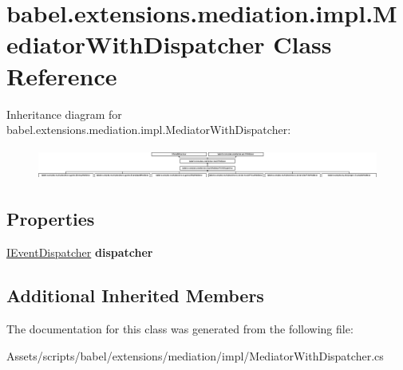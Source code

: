 \hypertarget{classbabel_1_1extensions_1_1mediation_1_1impl_1_1_mediator_with_dispatcher}{\section{babel.\-extensions.\-mediation.\-impl.\-Mediator\-With\-Dispatcher Class Reference}
\label{classbabel_1_1extensions_1_1mediation_1_1impl_1_1_mediator_with_dispatcher}
}
Inheritance diagram for babel.\-extensions.\-mediation.\-impl.\-Mediator\-With\-Dispatcher\-:\begin{figure}[H]
\begin{center}
\leavevmode
\includegraphics[height=1.051643cm]{classbabel_1_1extensions_1_1mediation_1_1impl_1_1_mediator_with_dispatcher}
\end{center}
\end{figure}
\subsection*{Properties}
\begin{DoxyCompactItemize}
\item 
\hypertarget{classbabel_1_1extensions_1_1mediation_1_1impl_1_1_mediator_with_dispatcher_a5d05ce891326e62b9dfc366dd1b5908b}{\hyperlink{interfacebabel_1_1extensions_1_1dispatcher_1_1eventdispatcher_1_1api_1_1_i_event_dispatcher}{I\-Event\-Dispatcher} {\bfseries dispatcher}}\label{classbabel_1_1extensions_1_1mediation_1_1impl_1_1_mediator_with_dispatcher_a5d05ce891326e62b9dfc366dd1b5908b}

\end{DoxyCompactItemize}
\subsection*{Additional Inherited Members}


The documentation for this class was generated from the following file\-:\begin{DoxyCompactItemize}
\item 
Assets/scripts/babel/extensions/mediation/impl/Mediator\-With\-Dispatcher.\-cs\end{DoxyCompactItemize}
